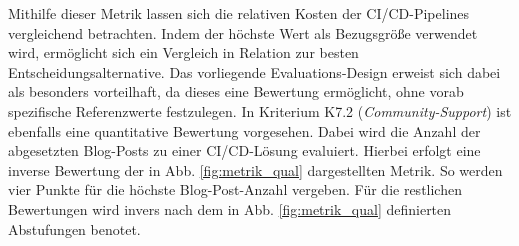\vspace*{-15mm}
Mithilfe dieser Metrik lassen sich die relativen Kosten der CI/CD-Pipelines vergleichend betrachten. Indem der höchste Wert als Bezugsgröße verwendet wird, ermöglicht sich ein Vergleich in Relation zur besten Entscheidungsalternative. Das vorliegende Evaluations-Design erweist sich dabei als besonders vorteilhaft, da dieses eine Bewertung ermöglicht, ohne vorab spezifische Referenzwerte festzulegen. In Kriterium K7.2 (\textit{Community-Support}) ist ebenfalls eine quantitative Bewertung vorgesehen. Dabei wird die Anzahl der abgesetzten Blog-Posts zu einer CI/CD-Lösung evaluiert. Hierbei erfolgt eine inverse Bewertung der in Abb. \ref*{fig:metrik_qual} dargestellten Metrik. So werden vier Punkte für die höchste Blog-Post-Anzahl vergeben. Für die restlichen Bewertungen wird invers nach dem in Abb. \ref*{fig:metrik_qual} definierten Abstufungen benotet. 

